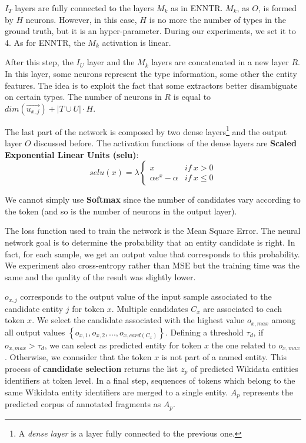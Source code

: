 \documentclass{llncs}
\begin{document}
$I_T$ layers are fully connected to the layers $M_k$ as in ENNTR. $M_k$, as $O$, is formed by $H$ neurons. However, in this case, $H$ is no more the number of types in the ground truth, but it is an hyper-parameter. During our experiments, we set it to 4. As for ENNTR, the $M_k$ activation is linear.
 
After this step, the $I_U$ layer and the $M_k$ layers are concatenated in a new layer $R$. In this layer, some neurons represent the type information, some other the entity features. The idea is to exploit the fact that some extractors better disambiguate on certain types. The number of neurons in $R$ is equal to $dim(\vec{u_{x,j}}) + \left\vert{T \cup U}\right\vert \cdot H$.

The last part of the network is composed by two dense layers\footnote{A \textit{dense layer} is a layer fully connected to the previous one.} and the output layer $O$ discussed before. The activation functions of the dense layers are \textbf{Scaled Exponential Linear Units (selu)}:
$$selu(x) = \lambda \left\{\begin{matrix} 
x & if \: x > 0\\
\alpha e^{x} - \alpha & if \: x \leq 0 
\end{matrix}\right.$$

We cannot simply use \textbf{Softmax} since the number of candidates vary according to the token (and so is the number of neurons in the output layer).

The loss function used to train the network is the Mean Square Error. The neural network goal is to determine the probability that an entity candidate is right. In fact, for each sample, we get an output value that corresponds to this probability.
We experiment also cross-entropy rather than MSE but the training time was the same and the quality of the result was slightly lower.


$o_{x,j}$ corresponds to the output value of the input sample associated to the candidate entity $j$ for token $x$. Multiple candidates $C_x$ are associated to each token $x$. We select the candidate associated with the highest value $o_{x,max}$ among all output values $\left \{  o_{x,1},o_{x,2},...,o_{x,card(C_x)} \right \}$. Defining a threshold $\tau_d$, if $o_{x,max} > \tau_d$, we can select as predicted entity for token $x$ the one related to $o_{x,max}$. Otherwise, we connsider that the token $x$ is not part of a named entity. This process of \textbf{candidate selection} returns the list $z_{p}$ of predicted Wikidata entities identifiers at token level. In a final step, sequences of tokens which belong to the same Wikidata entity identifiers are merged to a single entity. $A_{p}$ represents the predicted corpus of annotated fragments as $A_{p}$.
\end{document}
